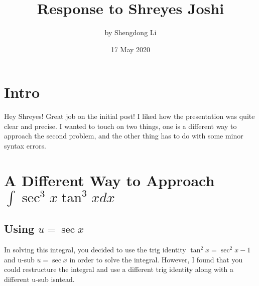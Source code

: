 \documentclass[letterpaper, 12pt]{article}
\begin{document}
\title{Response to Shreyes Joshi}
\author{by Shengdong Li}
\date{17 May 2020}
\maketitle

\section{Intro}
Hey Shreyes! Great job on the initial post! I liked how the presentation was quite clear and precise. I wanted to touch on two things, one is a different way to approach the second problem, and the other thing has to do with some minor syntax errors.

\section{A Different Way to Approach $\int\sec^{3}x\tan^{3}xdx$}
\subsection{Using $u=\sec x$}
In solving this integral, you decided to use the trig identity $\tan^{2}x=\sec^{2}x-1$ and u-sub $u=\sec x$ in order to solve the integral. However, I found that you could restructure the integral and use a different trig identity along with a different u-sub isntead.
\end{document}
